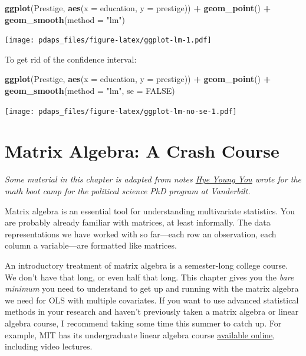 \documentclass[12pt,oneside,openany]{book}
\newenvironment{Shaded}{\begin{snugshade}}{\end{snugshade}}
\newcommand{\KeywordTok}[1]{\textcolor[rgb]{0.13,0.29,0.53}{\textbf{#1}}}
\newcommand{\DataTypeTok}[1]{\textcolor[rgb]{0.13,0.29,0.53}{#1}}
\newcommand{\StringTok}[1]{\textcolor[rgb]{0.31,0.60,0.02}{#1}}
\newcommand{\OtherTok}[1]{\textcolor[rgb]{0.56,0.35,0.01}{#1}}
\newcommand{\OperatorTok}[1]{\textcolor[rgb]{0.81,0.36,0.00}{\textbf{#1}}}
\newcommand{\NormalTok}[1]{#1}
\begin{document}
\begin{Shaded}
\begin{Highlighting}[]
\KeywordTok{ggplot}\NormalTok{(Prestige, }\KeywordTok{aes}\NormalTok{(}\DataTypeTok{x =}\NormalTok{ education, }\DataTypeTok{y =}\NormalTok{ prestige)) }\OperatorTok{+}
\StringTok{  }\KeywordTok{geom_point}\NormalTok{() }\OperatorTok{+}
\StringTok{  }\KeywordTok{geom_smooth}\NormalTok{(}\DataTypeTok{method =} \StringTok{"lm"}\NormalTok{)}
\end{Highlighting}
\end{Shaded}

\texttt{[image: pdaps\_files/figure-latex/ggplot-lm-1.pdf]}

To get rid of the confidence interval:

\begin{Shaded}
\begin{Highlighting}[]
\KeywordTok{ggplot}\NormalTok{(Prestige, }\KeywordTok{aes}\NormalTok{(}\DataTypeTok{x =}\NormalTok{ education, }\DataTypeTok{y =}\NormalTok{ prestige)) }\OperatorTok{+}
\StringTok{  }\KeywordTok{geom_point}\NormalTok{() }\OperatorTok{+}
\StringTok{  }\KeywordTok{geom_smooth}\NormalTok{(}\DataTypeTok{method =} \StringTok{"lm"}\NormalTok{, }\DataTypeTok{se =} \OtherTok{FALSE}\NormalTok{)}
\end{Highlighting}
\end{Shaded}

\texttt{[image: pdaps\_files/figure-latex/ggplot-lm-no-se-1.pdf]}

\chapter{Matrix Algebra: A Crash Course}\label{matrix}

\emph{Some material in this chapter is adapted from notes
\href{https://hyeyoungyou.com}{Hye Young You} wrote for the math boot
camp for the political science PhD program at Vanderbilt.}

Matrix algebra is an essential tool for understanding multivariate
statistics. You are probably already familiar with matrices, at least
informally. The data representations we have worked with so far---each
row an observation, each column a variable---are formatted like
matrices.

An introductory treatment of matrix algebra is a semester-long college
course. We don't have that long, or even half that long. This chapter
gives you the \emph{bare minimum} you need to understand to get up and
running with the matrix algebra we need for OLS with multiple
covariates. If you want to use advanced statistical methods in your
research and haven't previously taken a matrix algebra or linear algebra
course, I recommend taking some time this summer to catch up. For
example, MIT has its undergraduate linear algebra course
\href{https://ocw.mit.edu/courses/mathematics/18-06-linear-algebra-spring-2010/index.htm}{available
online}, including video lectures.
\end{document}
